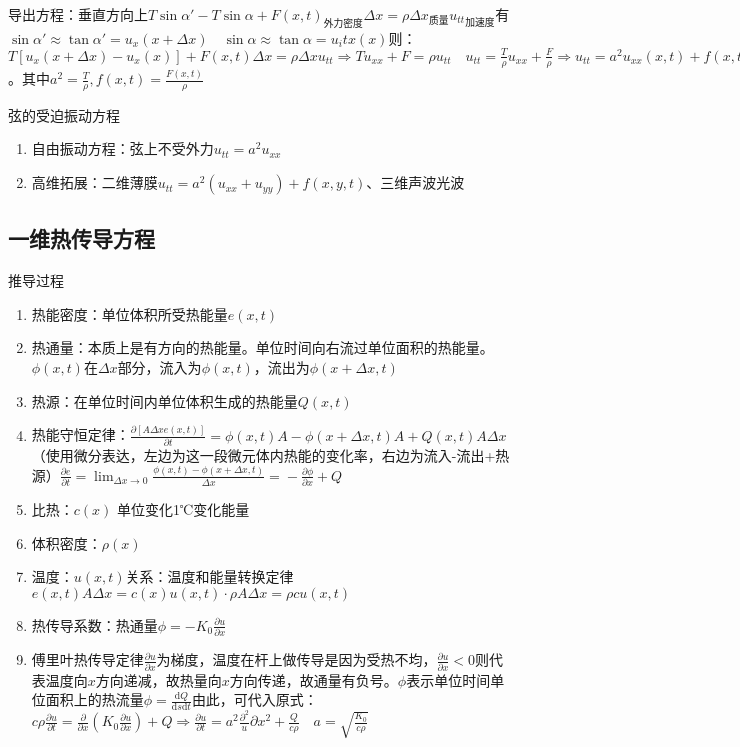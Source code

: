 导出方程：垂直方向上\(T\sin\alpha'-T\sin\alpha+F(x,t)_{\text{外力密度}}\Delta x=\rho\Delta x_{\text{质量}}{u_{tt}}_\text{加速度}\)有\(\sin\alpha'\approx\tan{\alpha'}=u_x(x+\Delta x)\quad\sin\alpha\approx\tan\alpha=u_it{x}(x)\)则：\(T\left[u_x\left(x+\Delta x\right)-u_x(x)\right]+F(x,t)\Delta x=\rho\Delta xu_{tt}\Rightarrow Tu_{xx}+F=\rho u_{tt}\quad u_{tt}=\frac{T}{\rho}u_{xx}+\frac{F}{\rho}\Rightarrow u_{tt}=a^2u_{xx}(x,t)+f(x,t)\)。其中\(a^2=\frac{T}{\rho},f(x,t)=\frac{F(x,t)}{\rho}\)

弦的受迫振动方程
\begin{enumerate}
	\item 自由振动方程：弦上不受外力\(u_{tt}=a^2u_{xx}\)
	\item 高维拓展：二维薄膜\(u_{tt}=a^2\left(u_{xx}+u_{yy}\right)+f(x,y,t)\)、三维声波光波
\end{enumerate}

\subsection{一维热传导方程}

推导过程
\begin{enumerate}
	\item 热能密度：单位体积所受热能量\(e(x,t)\)
	\item 热通量：本质上是有方向的热能量。单位时间向右流过单位面积的热能量。\(\phi(x,t)\)在\(\Delta x\)部分，流入为\(\phi(x,t)\)，流出为\(\phi\left(x+\Delta x,t\right)\)
	\item 热源：在单位时间内单位体积生成的热能量\(Q(x,t)\)
	\item 热能守恒定律：\(\frac{\partial\left[A\Delta xe(x,t)\right]}{\partial t}=\phi(x,t)A-\phi\left(x+\Delta x,t\right)A+Q(x,t)A\Delta x\)（使用微分表达，左边为这一段微元体内热能的变化率，右边为流入-流出+热源）\(\frac{\partial e}{\partial t}=\lim_{\Delta x\rightarrow0}{\frac{\phi(x,t)-\phi\left(x+\Delta x,t\right)}{\Delta x}=}-\frac{\partial\phi}{\partial x}+Q\)
	\item 比热：\(c(x)\) 单位变化1℃变化能量
	\item 体积密度：\(\rho(x)\)
	\item 温度：\(u(x,t)\)关系：温度和能量转换定律\(e(x,t)A\Delta x=c(x)u(x,t)\cdot\rho A\Delta x=\rho cu(x,t)\)
	\item 热传导系数：热通量\(\phi=-K_0\frac{\partial u}{\partial x}\)
	\item 傅里叶热传导定律\(\frac{\partial u}{\partial x}\)为梯度，温度在杆上做传导是因为受热不均，\(\frac{\partial u}{\partial x}<0\)则代表温度向\(x\)方向递减，故热量向\(x\)方向传递，故通量有负号。\(\phi\)表示单位时间单位面积上的热流量\(\phi=\frac{\mathrm{d}Q}{\mathrm{d}s\mathrm{d}t}\)由此，可代入原式：\(c\rho\frac{\partial u}{\partial t}=\frac{\partial}{\partial x}\left(K_0\frac{\partial u}{\partial x}\right)+Q\Rightarrow\frac{\partial u}{\partial t}=a^2\frac{\partial^2}u{\partial x^2}+\frac{Q}{c\rho}\quad a=\sqrt{\frac{K_0}{c\rho}}\)
\end{enumerate}
		
